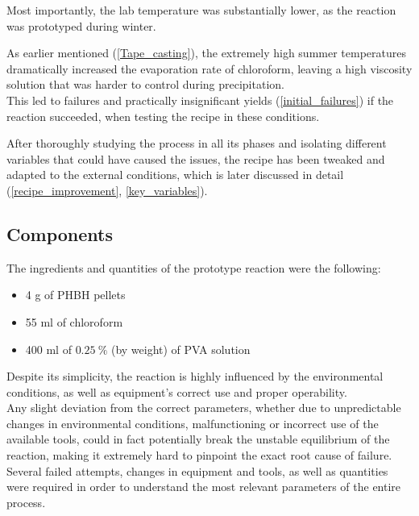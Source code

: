 \documentclass{article}
\begin{document}
    Most importantly, the lab temperature was substantially lower, as the reaction was prototyped during winter. 
    
    As earlier mentioned (\ref{Tape_casting}), the extremely high summer temperatures dramatically increased the evaporation rate of 
    chloroform, leaving a high viscosity solution that was harder to control during precipitation. \\

    This led to failures and practically insignificant yields (\ref{initial_failures}) if 
    the reaction succeeded, when testing the recipe in these conditions.  

    After thoroughly studying the process in all its phases and isolating different variables that could have caused the issues, 
    the recipe has been tweaked and adapted to the external conditions, which is later discussed 
    in detail (\ref{recipe_improvement}, \ref{key_variables}). 

        \subsection{Components\label{Components}}

        The ingredients and quantities of the prototype reaction were the following: 

            \begin{itemize}
                \item 4 g of PHBH pellets 
                \item 55 ml of chloroform 
                \item 400 ml of $0.25 \ \% $ (by weight) of PVA solution 
            \end{itemize}

        Despite its simplicity, the reaction is highly influenced by the environmental conditions, as well as
        equipment's correct use and proper operability. \\ 
        
        Any slight deviation from the correct parameters, whether due to 
        unpredictable changes in environmental conditions, malfunctioning or incorrect use of the available tools, could 
        in fact potentially break the unstable equilibrium of the reaction, making it extremely 
        hard to pinpoint the exact root cause of failure. \\  

        Several failed attempts, changes in equipment and tools, as well as quantities were required in order 
        to understand the most relevant parameters of the entire process. 
\end{document}
